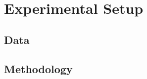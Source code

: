 \section{Experimental Setup} \label{sec:experimental-setup}
\subsection{Data} \label{subsec:data}

\subsection{Methodology} \label{subsec:methodology}


